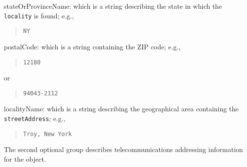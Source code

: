 \begin{describe}
\item[stateOrProvinceName:]
			which is a string describing the state in which
			the \verb"locality" is found; e.g.,
\begin{quote}\small\begin{verbatim}
NY
\end{verbatim}\end{quote}

\item[postalCode:]
			which is a string containing the ZIP code; e.g.,
\begin{quote}\small\begin{verbatim}
12180
\end{verbatim}\end{quote}
or
\begin{quote}\small\begin{verbatim}
94043-2112
\end{verbatim}\end{quote}

\item[localityName:]
			which is a string describing the geographical
			area containing the \verb"streetAddress"; e.g.,
\begin{quote}\small\begin{verbatim}
Troy, New York
\end{verbatim}\end{quote}
\end{describe}
The second optional group describes telecommunications addressing information
for the object.
